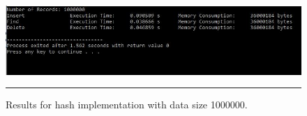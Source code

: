 \begin{figure}[H]
	\centering
	\includegraphics[scale =0.7]{./Figures/hash1000000.jpg}
	\rule{35em}{0.5pt}
	\caption{Results for hash implementation with data size 1000000.}
	\label{fig:Hash 1000000}
\end{figure}
